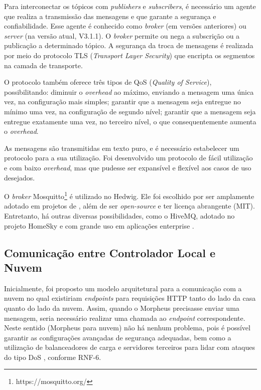 Para interconectar os tópicos com \textit{publishers} e \textit{subscribers}, é necessário um agente que realiza a transmissão das mensagens e que garante a segurança e confiabilidade. Esse agente é conhecido como \emph{broker} (em versões anteriores) ou \emph{server} (na versão atual, V3.1.1). O \textit{broker} permite ou nega a subscrição ou a publicação a determinado tópico. A segurança da troca de mensagens é realizada por meio do protocolo TLS (\textit{Transport Layer Security}) que encripta os segmentos na camada de transporte.

O protocolo \wmqtt{} também oferece três tipos de QoS (\textit{Quality of Service}), possibilitando: diminuir o \emph{overhead} ao máximo, enviando a mensagem uma única vez, na configuração mais simples; garantir que a mensagem seja entregue no mínimo uma vez, na configuração de segundo nível; garantir que a mensagem seja entregue exatamente uma vez, no terceiro nível, o que consequentemente aumenta o \emph{overhead}.

As mensagens são transmitidas em texto puro, e é necessário estabelecer um protocolo para a sua utilização. Foi desenvolvido um protocolo de fácil utilização e com baixo \emph{overhead}, mas que pudesse ser expansível e flexível aos casos de uso desejados.

O \textit{broker} Mosquitto\footnote{https://mosquitto.org/} é utilizado no Hedwig. Ele foi escolhido por ser amplamente adotado em projetos de \wiot{}, além de ser \emph{open-source} e ter licença abrangente (MIT). Entretanto, há outras diversas possibilidades, como o HiveMQ, adotado no projeto HomeSky e com grande uso em aplicações enterprise \cite{hiveMq}.

\subsection{Comunicação entre Controlador Local e Nuvem}

Inicialmente, foi proposto um modelo arquitetural para a comunicação com a nuvem no qual existiriam \emph{endpoints} para requisições HTTP tanto do lado da casa quanto do lado da nuvem. Assim, quando o Morpheus precisasse enviar uma mensagem, seria necessário realizar uma chamada ao \emph{endpoint} correspondente. Neste sentido (Morpheus para nuvem) não há nenhum problema, pois é possível garantir as configurações avançadas de segurança adequadas, bem como a utilização de balanceadores de carga e servidores terceiros para lidar com ataques do tipo DoS \cite{akamai}, conforme RNF-6.

